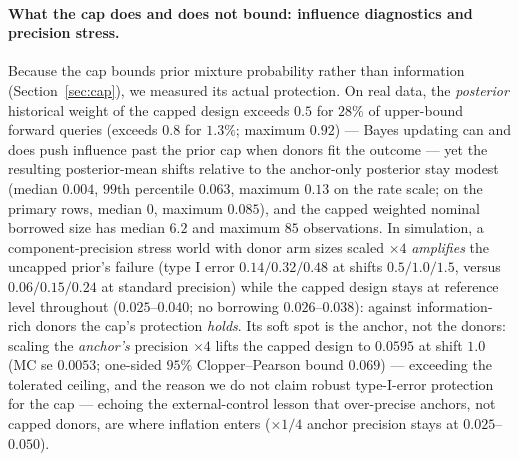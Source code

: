 \documentclass[11pt]{article}
\begin{document}
\paragraph{What the cap does and does not bound: influence diagnostics and
precision stress.} Because the cap bounds prior mixture probability rather
than information (Section~\ref{sec:cap}), we measured its actual
protection. On real data, the \emph{posterior} historical weight of the
capped design exceeds $0.5$ for $28\%$ of upper-bound forward queries
(exceeds $0.8$ for $1.3\%$; maximum $0.92$) --- Bayes updating can and
does push influence past the prior cap when donors fit the outcome ---
yet the resulting posterior-mean shifts relative to the anchor-only
posterior stay modest (median $0.004$, $99$th percentile $0.063$, maximum
$0.13$ on the rate scale; on the primary rows, median $0$, maximum
$0.085$), and the capped weighted nominal borrowed size has median $6.2$
and maximum $85$ observations. In simulation, a component-precision
stress world with donor arm sizes scaled $\times 4$ \emph{amplifies} the
uncapped prior's failure (type I error $0.14/0.32/0.48$ at shifts
$0.5/1.0/1.5$, versus $0.06/0.15/0.24$ at standard precision) while the
capped design stays at reference level throughout
($0.025$--$0.040$; no borrowing $0.026$--$0.038$): against
information-rich donors the cap's protection \emph{holds}. Its soft spot
is the anchor, not the donors: scaling the \emph{anchor's} precision
$\times 4$ lifts the capped design to $0.0595$ at shift $1.0$ (MC se
$0.0053$; one-sided $95\%$ Clopper--Pearson bound $0.069$) --- exceeding
the tolerated ceiling, and the reason we do not claim robust
type-I-error protection for the cap --- echoing the external-control
lesson that over-precise anchors, not capped donors, are where inflation
enters ($\times 1/4$ anchor precision stays at $0.025$--$0.050$).
\end{document}
